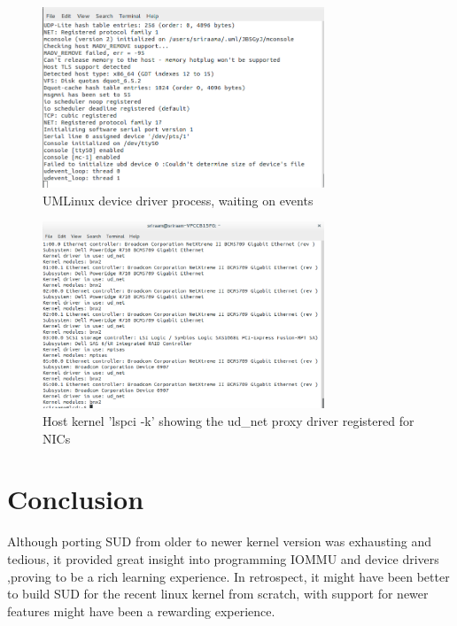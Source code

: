 \documentclass[11pt,titlepage,a4paper]{article}
\begin{document}
\begin{figure}[h!]
  \caption{UMLinux device driver process, waiting on events}
  \includegraphics[width=0.75\textwidth]{./scr.png}
\end{figure}
\begin{figure}[h!]
  \caption{Host kernel 'lspci -k' showing the ud\_net proxy driver registered for NICs}
  \includegraphics[width=0.75\textwidth]{./ud.png}
\end{figure}


\section{Conclusion}
Although porting SUD from older to newer kernel version was exhausting and tedious, it provided great insight into programming IOMMU and device drivers ,proving to be a rich learning experience. In retrospect, it might have been better to build SUD for the recent linux kernel from  scratch, with support for newer features  might have been a rewarding experience. 
\end{document}
